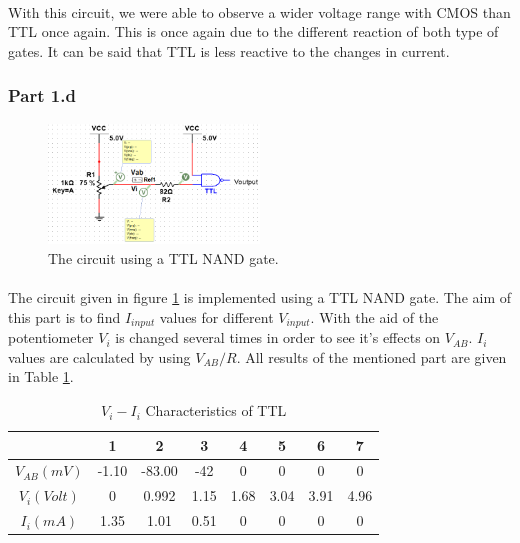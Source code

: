 \documentclass[pdftex,12pt,a4paper]{article}
\begin{document}
\begin{flushleft}
\paragraph{}

With this circuit, we were able to observe a wider voltage range with CMOS than TTL once again. This is once again due to the different reaction of both type of gates. It can be said that TTL is less reactive to the changes in current.
\end{flushleft}





\newpage
\begin{flushleft}
\subsubsection{Part 1.d}

 \begin{figure}[h]
    	\centering
    	\includegraphics[width=0.5\textwidth]{part1d-ttl.png}
    	\caption{The circuit using a TTL NAND gate.}
    	\label{fig:4-part1d-ttl}
\end{figure}

\paragraph{}The circuit given in figure \ref{fig:4-part1d-ttl} is implemented using a TTL NAND gate. The aim of this part is to find $I_{input}$ values for different $V_{input}$. With the aid of the potentiometer $V_{i}$ is changed several times in order to see it's effects on $V_{AB}$. $I_{i}$ values are calculated by using $V_{AB}/R$. All results of the mentioned part are given in Table \ref{part1d-ttl}.

\begin{table}[h]
\begin{tabular}{c|c|c|c|c|c|c|c|}
               & 1     & 2      & 3    & 4 & 5    & 6    & 7    \\ \hline
$V_{AB} (mV)$  & -1.10 & -83.00 & -42  & 0 & 0    & 0    & 0    \\ \hline
$V_{i} (Volt)$ & 0     & 0.992  & 1.15 & 1.68 & 3.04 & 3.91 & 4.96 \\ \hline
$I_{i} (mA)$   & 1.35  & 1.01   & 0.51 & 0 & 0    & 0    & 0   
\end{tabular}
\centering
\caption{$V_{i} - I_{i}$ Characteristics of TTL}
\label{part1d-ttl}
\end{table}



\end{flushleft}
\end{document}
